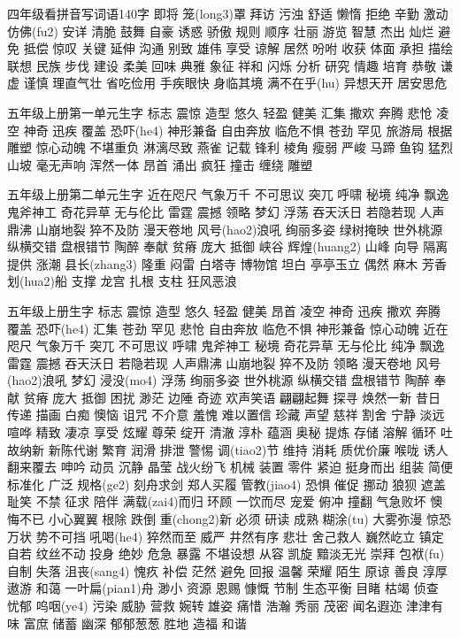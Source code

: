 \documentclass[a4paper]{article}
\newcommand{\grids}[1]{\cizu*[pysize=small,pycolorx=red,py=false,ccfont=kaiti,ccsize=Huge,gridcolor=red!50!,cc=false,griddashcolor=red]{#1}}
\begin{document}
四年级看拼音写词语140字
即将 笼(long3)罩 拜访 污浊 舒适 懒惰 拒绝 辛勤 激动 仿佛(fu2) 安详 清脆 鼓舞 自豪 诱惑
骄傲 规则 顺序 壮丽 游览 智慧 杰出 灿烂 避免 抵偿 惊叹 关键 延伸 沟通 别致 雄伟 享受
谅解 居然 吩咐 收获 体面 承担 描绘 联想 民族 步伐 建设 柔美 回味 典雅 象征 祥和 闪烁
分析 研究 情趣 培育 恭敬 谦虚 谨慎 理直气壮 省吃俭用 手疾眼快 身临其境 满不在乎(hu)
异想天开 居安思危

五年级上册第一单元生字
标志 震惊 造型 悠久 轻盈 健美 汇集 撒欢 奔腾 悲怆 凌空 神奇 迅疾 覆盖 恐吓(he4)
神形兼备 自由奔放 临危不惧 苍劲 罕见 旅游局 根据 雕塑 惊心动魄 不堪重负 淋漓尽致 燕雀
记载 锋利 棱角 瘦弱 严峻 马蹄 鱼钩 猛烈 山坡 毫无声响 浑然一体 昂首 涌出 疯狂 撞击
缠绕 雕塑

五年级上册第二单元生字
近在咫尺 气象万千 不可思议 突兀 呼啸 秘境 纯净 飘逸 鬼斧神工 奇花异草 无与伦比 雷霆
震撼 领略 梦幻 浮荡 吞天沃日 若隐若现 人声鼎沸 山崩地裂 猝不及防 漫天卷地 风号(hao2)浪吼
绚丽多姿 绿树掩映 世外桃源 纵横交错 盘根错节 陶醉 奉献 贫瘠 庞大 抵御 峡谷 辉煌(huang2) 山峰
向导 隔离 提供 涨潮 县长(zhang3) 隆重 闷雷 白塔寺 博物馆 坦白 亭亭玉立 偶然 麻木 芳香
划(hua2)船 支撑 龙宫 扎根 支柱 狂风恶浪

五年级上册生字
标志 震惊 造型 悠久 轻盈 健美 昂首 凌空 神奇 迅疾 撒欢 奔腾 覆盖 恐吓(he4)
汇集 苍劲 罕见 悲怆 自由奔放 临危不惧 神形兼备 惊心动魄 近在咫尺 气象万千 突兀 不可思议
呼啸 鬼斧神工 秘境 奇花异草 无与伦比 纯净 飘逸 雷霆 震撼 吞天沃日 若隐若现 人声鼎沸
山崩地裂 猝不及防 领略 漫天卷地 风号(hao2)浪吼 梦幻 浸没(mo4) 浮荡 绚丽多姿 世外桃源
纵横交错 盘根错节 陶醉 奉献 贫瘠 庞大 抵御 困扰 渺茫 边陲 奇迹 欢声笑语 翩翩起舞 探寻
焕然一新 昔日 传递 描画 白痴 懊恼 诅咒 不介意 羞愧 难以置信 珍藏 声望 慈祥 割舍 宁静
淡远 喧哗 精致 凄凉 享受 炫耀 尊荣 绽开 清澈 淳朴 蕴涵 奥秘 提炼 存储 溶解 循环 吐故纳新
新陈代谢 繁育 润滑 排泄 警惕 调(tiao2)节 维持 消耗 质优价廉 喉咙 诱人 翻来覆去 呻吟 动员
沉静 晶莹 战火纷飞 机械 装置 零件 紧迫 挺身而出 组装 简便 标准化 广泛 规格(ge2) 刻舟求剑
郑人买履 管教(jiao4) 恐惧 催促 挪动 狼狈 遮盖 耻笑 不禁 征求 陪伴 满载(zai4)而归 环顾
一饮而尽 宠爱 俯冲 撞翻 气急败坏 懊悔不已 小心翼翼 根除 跌倒 重(chong2)新 必须 研读 成熟
糊涂(tu) 大雾弥漫 惊恐万状 势不可挡 吼喝(he4) 猝然而至 威严 井然有序 悲壮 舍己救人
巍然屹立 镇定自若 纹丝不动 投身 绝妙 危急 暴露 不堪设想 从容 凯旋 黯淡无光 崇拜 包袱(fu)
自制 失落 沮丧(sang4) 愧疚 补偿 茫然 避免 回报 温馨 荣耀 陌生 原谅 善良 淳厚 遨游 和蔼
一叶扁(pian1)舟 渺小 资源 恩赐 慷慨 节制 生态平衡 目睹 枯竭 侦查 忧郁 呜咽(ye4) 污染 威胁 营救
婉转 雄姿 痛惜 浩瀚 秀丽 茂密 闻名遐迩 津津有味 富庶 储蓄 幽深 郁郁葱葱 胜地 造福 和谐


\newpage
\iffalse%
echo "\\gzyni\\grids{%
for ($i=0; $i<15; $i++) {
	echo "\\makebox[\\textwidth][s]{";
	print_zy("我我我我我我我我我我我我我我我我", true);
	echo "}\\vspace{0ex}\\gzynl\n";
}
echo "}\n";
\fi%
\end{document}
